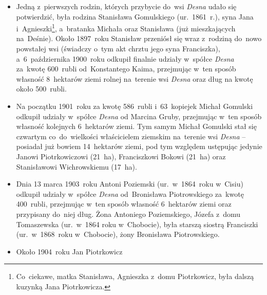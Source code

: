 \begin{itemize}
    \item Jedną z~pierwszych rodzin, których przybycie do~wsi \emph{Desna}
    udało się potwierdzić, była rodzina Stanisława
    Gomulskiego
    (ur.~1861~r.), syna Jana i~Agnieszki\footnote{Co~ciekawe, matka Stanisława,
    Agnieszka z~domu Piotrkowicz, była dalszą kuzynką Jana Piotrkowicza.},
    a~bratanka Michała oraz Stanisława (już mieszkających na~Deśnie). Około
    1897~roku Stanisław przeniósł się wraz z~rodziną do~nowo powstałej wsi
    (świadczy o~tym akt chrztu jego syna Franciszka), a~6~października
    1900~roku odkupił finalnie udziały w~spółce \emph{Desna} za~kwotę
    600~rubli od~Konstantego
    Kaima, przejmując w~ten
    sposób własność 8~hektarów ziemi rolnej na~terenie wsi \emph{Desna} oraz
    dług na kwotę około 500~rubli.
    \item Na początku 1901~roku za kwotę 586~rubli i~63~kopiejek Michał
    Gomulski odkupił udziały
    w~spółce \emph{Desna} od Marcina Gruby, przejmując w~ten sposób własność kolejnych 6~hektarów ziemi.
    Tym samym Michał Gomulski stał się czwartym co~do~wielkości właścicielem
    ziemskim na~terenie wsi \emph{Desna} -- posiadał już bowiem 14~hektarów
    ziemi, pod tym względem ustępując jedynie Janowi
    Piotrkowiczowi
    (21~ha), Franciszkowi
    Bokowi (21~ha) oraz
    Stanisławowi Wichrowskiemu (17~ha).
    \item Dnia 13 marca 1903~roku Antoni
    Poziemski (ur.~w~1864~roku
    w~Cisiu) odkupił udziały w~spółce \emph{Desna} od~Bronisława
    Piotrowskiego
    za~kwotę 400~rubli, przejmując w~ten sposób własność 6~hektarów ziemi
    oraz przypisany do~niej dług. Żona Antoniego Poziemskiego,
    Józefa z~domu
    Tomaszewska (ur.~w~1864 roku w~Chobocie), była starszą siostrą
    Franciszki
    (ur.~w~1868~roku w~Chobocie), żony Bronisława Piotrowskiego. 
    \item Około 1904~roku Jan
    Piotrkowicz

\end{itemize}
